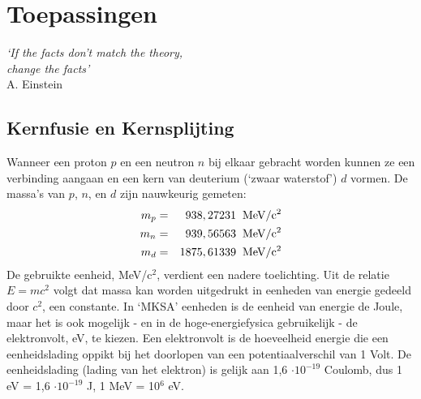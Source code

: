 \chapter{Toepassingen}
\vspace{-1cm}\begin{flushright}
{\it `If the facts don't match the theory, \\ change the facts'}\\ A. Einstein
\end{flushright}

\section{Kernfusie en Kernsplijting}
Wanneer een proton $p$ en een neutron $n$ bij elkaar gebracht worden kunnen
ze een verbinding aangaan en een kern van deuterium (`zwaar waterstof') $d$
vormen.
De massa's van $p$, $n$, en $d$ zijn nauwkeurig gemeten:
\begin{eqnarray*}
m_{p} & = & 938,27231 \;\; {\rm MeV/c^{2}} \\
m_{n} & = & 939,56563 \;\; {\rm MeV/c^{2}} \\
m_{d} & = & 1875,61339 \;\; {\rm MeV/c^{2}}
\end{eqnarray*}
De gebruikte eenheid, MeV/c$^{2}$, verdient een nadere toelichting.
Uit de relatie $E = mc^{2}$ volgt dat massa kan worden uitgedrukt in eenheden
van energie gedeeld door $c^{2}$, een constante.
In `MKSA' eenheden is de eenheid van energie de Joule, maar het is ook
mogelijk - en in de hoge-energiefysica gebruikelijk - de elektronvolt, eV, te
kiezen.
Een elektronvolt is de hoeveelheid energie die een eenheidslading oppikt bij
het doorlopen van een potentiaalverschil van 1 Volt.
De eenheidslading (lading van het elektron) is gelijk aan 1,6 $\cdot
10^{-19}$ Coulomb, dus 1 eV = 1,6 $\cdot 10^{-19}$ J, 1 MeV = 10$^{6}$ eV.


\begin{figure}[ht]
\centering
\caption{}
\label{f:pnbotsing}
\end{figure}


